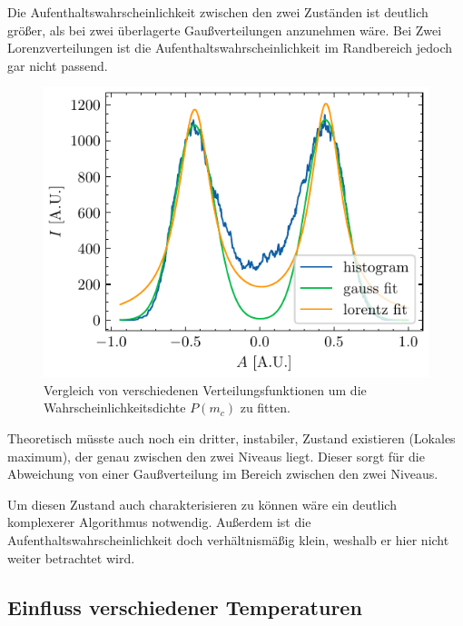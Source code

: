 \documentclass[main.tex]{subfiles}
\begin{document}
Die Aufenthaltswahrscheinlichkeit zwischen den zwei Zuständen ist deutlich größer, als bei zwei überlagerte Gaußverteilungen anzunehmen wäre. Bei Zwei Lorenzverteilungen ist die Aufenthaltswahrscheinlichkeit im Randbereich jedoch gar nicht passend.

\begin{figure}[H]
    \centering
    \includegraphics{bilder/plots/theo-vis/hist_fit_comp.pdf}
    \caption{Vergleich von verschiedenen Verteilungsfunktionen um die Wahrscheinlichkeitsdichte $P(m_c)$ zu fitten.}\label{fig:fit_func_comp}
\end{figure}

Theoretisch müsste auch noch ein dritter, instabiler, Zustand existieren (Lokales maximum), der genau zwischen den zwei Niveaus liegt. Dieser sorgt für die Abweichung von einer Gaußverteilung im Bereich zwischen den zwei Niveaus. 

Um diesen Zustand auch charakterisieren zu können wäre ein deutlich komplexerer Algorithmus notwendig. Außerdem ist die Aufenthaltswahrscheinlichkeit doch verhältnismäßig klein, weshalb er hier nicht weiter betrachtet wird.

\subsection{Einfluss verschiedener Temperaturen}

\end{document}
